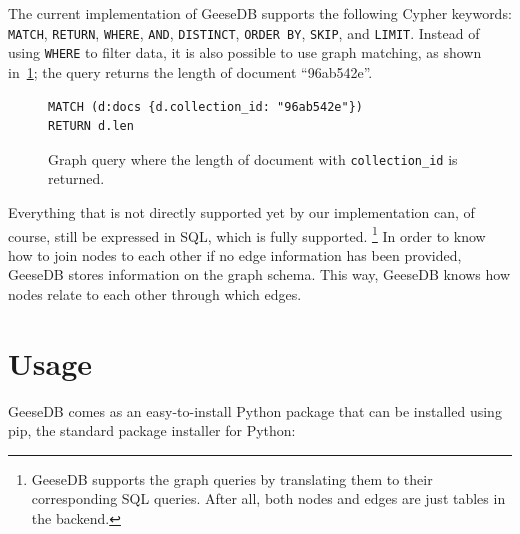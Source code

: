 The current implementation of  GeeseDB supports the following Cypher keywords: \texttt{MATCH}, \texttt{RETURN}, \texttt{WHERE}, \texttt{AND}, \texttt{DISTINCT}, \texttt{ORDER BY}, \texttt{SKIP}, and \texttt{LIMIT}. Instead of using \texttt{WHERE} to filter data, it is also possible to use graph matching, as shown in~\cref{fig:graph_query2}; the query returns the length of document ``96ab542e''. 
\begin{figure}
	\begin{verbatim}
MATCH (d:docs {d.collection_id: "96ab542e"})
RETURN d.len
	\end{verbatim}
	\caption{Graph query where the length of document with \texttt{collection\_id} is returned.}
	\label{fig:graph_query2}
\end{figure}
Everything that is not directly supported yet by our implementation can, of course, still be expressed in SQL, which is fully supported. \footnote{GeeseDB supports the graph queries by translating them to their corresponding SQL queries. After all, both nodes and edges are just tables in the backend.} In order to know how to join nodes to each other if no edge information has been provided, GeeseDB stores information on the graph schema. This way, GeeseDB knows how nodes relate to each other through which edges. 

\section{Usage}
GeeseDB comes as an easy-to-install Python package that can be installed using pip, the standard package installer for Python:


